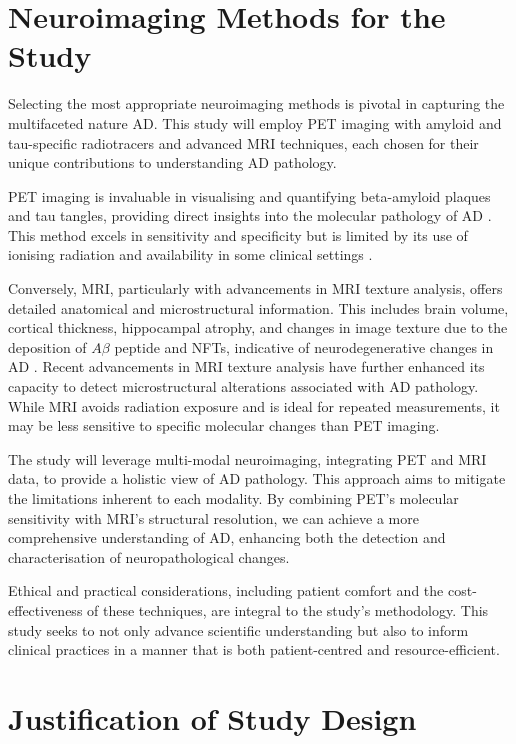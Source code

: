 \documentclass[10pt]{article}
\begin{document}
\begin{sloppypar}
  \section{Neuroimaging Methods for the Study}
  \label{sec:neuroimaging-methods}

  Selecting the most appropriate neuroimaging methods is pivotal in capturing the multifaceted nature AD. This study will employ PET imaging with amyloid and tau-specific radiotracers and advanced MRI techniques, each chosen for their unique contributions to understanding AD pathology.

  PET imaging is invaluable in visualising and quantifying beta-amyloid plaques and tau tangles, providing direct insights into the molecular pathology of AD \citep{jack_serial_2009}. This method excels in sensitivity and specificity but is limited by its use of ionising radiation and availability in some clinical settings \citep{bao_pet_2021}.

  Conversely, MRI, particularly with advancements in MRI texture analysis, offers detailed anatomical and microstructural information. This includes brain volume, cortical thickness, hippocampal atrophy, and changes in image texture due to the deposition of $A\beta$ peptide and NFTs, indicative of neurodegenerative changes in AD \citep{cai_magnetic_2020}. Recent advancements in MRI texture analysis have further enhanced its capacity to detect microstructural alterations associated with AD pathology. While MRI avoids radiation exposure and is ideal for repeated measurements, it may be less sensitive to specific molecular changes than PET imaging.

  The study will leverage multi-modal neuroimaging, integrating PET and MRI data, to provide a holistic view of AD pathology. This approach aims to mitigate the limitations inherent to each modality. By combining PET’s molecular sensitivity with MRI’s structural resolution, we can achieve a more comprehensive understanding of AD, enhancing both the detection and characterisation of neuropathological changes.

  Ethical and practical considerations, including patient comfort and the cost-effectiveness of these techniques, are integral to the study’s methodology. This study seeks to not only advance scientific understanding but also to inform clinical practices in a manner that is both patient-centred and resource-efficient.

  \section{Justification of Study Design}
  \label{sec:justification-of-study-design}


\end{sloppypar}
\end{document}
